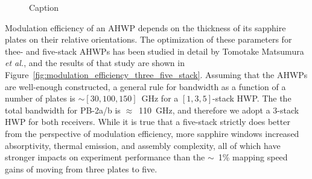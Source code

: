 \begin{figure}
    \centering
    \caption{Caption}
    \label{fig:modulation_effciency_countors}
\end{figure}

Modulation efficiency of an AHWP depends on the thickness of its sapphire plates on their relative orientations. The optimization of these parameters for thee- and five-stack AHWPs has been studied in detail by Tomotake Matsumura \textit{et al.}, and the results of that study are shown in Figure~\ref{fig:modulation_efficiency_three_five_stack}. Assuming that the AHWPs are well-enough constructed, a general rule for bandwidth as a function of a number of plates is $\sim [30, 100, 150]$~GHz for a $[1, 3, 5]$-stack HWP. The the total bandwidth for PB-2a/b is $\approx$~110~GHz, and therefore we adopt a 3-stack HWP for both receivers. While it is true that a five-stack strictly does better from the perspective of modulation efficiency, more sapphire windows increased absorptivity, thermal emission, and assembly complexity, all of which have stronger impacts on experiment performance than the $\sim$~1\% mapping speed gains of moving from three plates to five.

